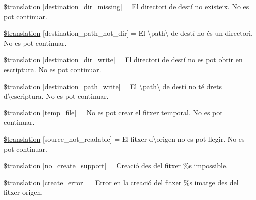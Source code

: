 \begin{DoxyCompactItemize}
\item 
\hyperlink{class_8upload_8ca___c_a_8php_a9ef28d3cf09942c6c0a1e77fa09185e8}{\$translation} \mbox{[}\textquotesingle{}destination\+\_\+dir\+\_\+missing\textquotesingle{}\mbox{]} = \textquotesingle{}El directori de destí no existeix. No es pot continuar.\textquotesingle{}
\item 
\hyperlink{class_8upload_8ca___c_a_8php_a5704a67137126e8c87b7a364175929d4}{\$translation} \mbox{[}\textquotesingle{}destination\+\_\+path\+\_\+not\+\_\+dir\textquotesingle{}\mbox{]} = \textquotesingle{}El \textbackslash{}\textquotesingle{}path\textbackslash{}\textquotesingle{} de destí no és un directori. No es pot continuar.\textquotesingle{}
\item 
\hyperlink{class_8upload_8ca___c_a_8php_a97608ea194a616db49141a0e6dee900c}{\$translation} \mbox{[}\textquotesingle{}destination\+\_\+dir\+\_\+write\textquotesingle{}\mbox{]} = \textquotesingle{}El directori de destí no es pot obrir en escriptura. No es pot continuar.\textquotesingle{}
\item 
\hyperlink{class_8upload_8ca___c_a_8php_a40e4e1962226b89fd76da5819a9602b0}{\$translation} \mbox{[}\textquotesingle{}destination\+\_\+path\+\_\+write\textquotesingle{}\mbox{]} = \textquotesingle{}El \textbackslash{}\textquotesingle{}path\textbackslash{}\textquotesingle{} de destí no té drets d\textbackslash{}\textquotesingle{}escriptura. No es pot continuar.\textquotesingle{}
\item 
\hyperlink{class_8upload_8ca___c_a_8php_a2baece8da11e20d45175db91851ec3e3}{\$translation} \mbox{[}\textquotesingle{}temp\+\_\+file\textquotesingle{}\mbox{]} = \textquotesingle{}No es pot crear el fitxer temporal. No es pot continuar.\textquotesingle{}
\item 
\hyperlink{class_8upload_8ca___c_a_8php_a922967ca2df0efdd455261142d8e5715}{\$translation} \mbox{[}\textquotesingle{}source\+\_\+not\+\_\+readable\textquotesingle{}\mbox{]} = \textquotesingle{}El fitxer d\textbackslash{}\textquotesingle{}origen no es pot llegir. No es pot continuar.\textquotesingle{}
\item 
\hyperlink{class_8upload_8ca___c_a_8php_a346dfd1ade29f583dd20d345c436859f}{\$translation} \mbox{[}\textquotesingle{}no\+\_\+create\+\_\+support\textquotesingle{}\mbox{]} = \textquotesingle{}Creació des del fitxer \%s impossible.\textquotesingle{}
\item 
\hyperlink{class_8upload_8ca___c_a_8php_a53013ce9255c4e1849098ddd9fdb2b3f}{\$translation} \mbox{[}\textquotesingle{}create\+\_\+error\textquotesingle{}\mbox{]} = \textquotesingle{}Error en la creació del fitxer \%s imatge des del fitxer origen.\textquotesingle{}

\end{DoxyCompactItemize}
